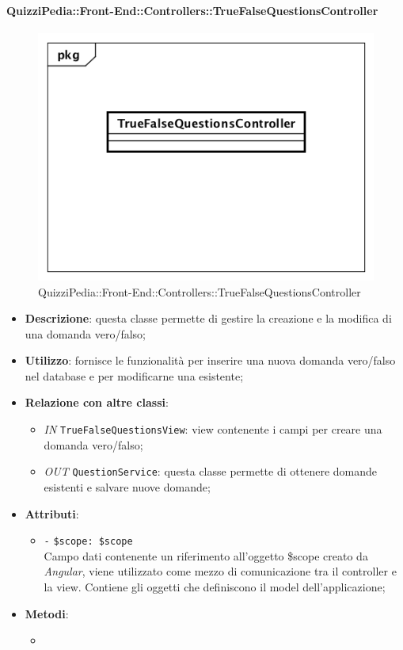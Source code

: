 \paragraph{QuizziPedia::Front-End::Controllers::TrueFalseQuestionsController}
\begin{figure}
	\centering
	\includegraphics[scale=0.45]{UML/Classi/Front-End/QuizziPedia_Front-end_Controller_TrueFalseQuestionsController.png}
	\caption{QuizziPedia::Front-End::Controllers::TrueFalseQuestionsController}
\end{figure}
\begin{itemize}
	\item \textbf{Descrizione}: questa classe permette di gestire la creazione e la modifica di una domanda vero/falso;
	\item \textbf{Utilizzo}: fornisce le funzionalità per inserire una nuova domanda vero/falso nel database e per modificarne una esistente;
	\item \textbf{Relazione con altre classi}:
	\begin{itemize}
		\item \textit{IN} \texttt{TrueFalseQuestionsView}: view contenente i campi per creare una domanda vero/falso;  
		\item \textit{OUT} \texttt{QuestionService}: questa classe permette di ottenere domande esistenti e salvare nuove domande;
	\end{itemize}
	\item \textbf{Attributi}:
	\begin{itemize}
		\item \texttt{-} \texttt{\$scope: \$scope} \\
		Campo dati contenente un riferimento all’oggetto \$scope creato da \textit{Angular}, viene utilizzato come mezzo di comunicazione tra il controller e la view. Contiene gli oggetti che definiscono il model dell’applicazione;
	\end{itemize}
	\item \textbf{Metodi}:
	\begin{itemize}
		\item 
	\end{itemize}
\end{itemize}

